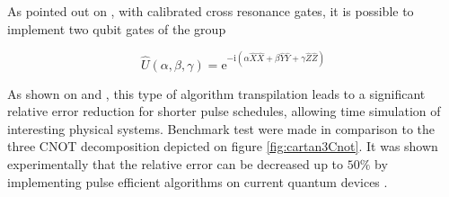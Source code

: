   As pointed out on \cite{RXZPulseEfficient}, with calibrated cross resonance gates, it is possible to implement two qubit gates of the group

  \begin{equation}
    \hat{U}(\alpha, \beta, \gamma) = \mathrm{e}^{-\mathrm{i}(\alpha\hat{X}\hat{X} + \beta\hat{Y}\hat{Y} + \gamma\hat{Z}\hat{Z})}
    \label{eq:CartanDecomp}
  \end{equation}

  

  As shown on \cite{RXZPulseEfficient} and \cite{MajoranaSimulation}, this type of algorithm transpilation leads to a significant relative error reduction for shorter pulse schedules, allowing time simulation of interesting physical systems. Benchmark test were made in comparison to the three CNOT decomposition depicted on figure \ref{fig:cartan3Cnot}. It was shown experimentally that the relative error can be decreased up to $50\%$ by implementing pulse efficient algorithms on current quantum devices \cite{RXZPulseEfficient}.



